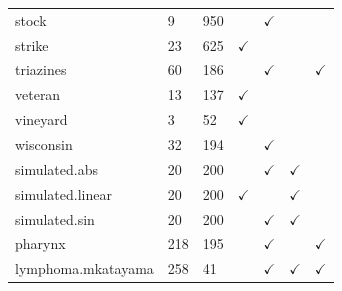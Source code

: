 \documentclass[12pt]{article}
\begin{document}
\begin{table}[!t]
\begin{tabular}{l|l|l|c|c|c|c}
stock                                        & 9                                             & 950                                            &          &$\checkmark$         &        &            \\
strike                                       & 23                                            & 625                                            &$\checkmark$       &            &        &            \\
triazines                                    & 60                                            & 186                                            &          &$\checkmark$         &        &$\checkmark$         \\
veteran                                      & 13                                            & 137                                            &$\checkmark$       &            &        &            \\
vineyard                                     & 3                                             & 52                                             &$\checkmark$       &            &        &            \\
wisconsin                                    & 32                                            & 194                                            &          &$\checkmark$         &        &            \\ \midrule
simulated.abs                                & 20                                            & 200                                            &          &$\checkmark$         &$\checkmark$     &            \\
simulated.linear                             & 20                                            & 200                                            &$\checkmark$       &            &$\checkmark$     &            \\
simulated.sin                                & 20                                            & 200                                            &          &$\checkmark$         &$\checkmark$     &            \\ \midrule
pharynx                                      & 218                                           & 195                                            &          &$\checkmark$         &        &$\checkmark$         \\
lymphoma.mkatayama                               & 258                                           & 41                                             &          &$\checkmark$         &$\checkmark$     &$\checkmark$         \\

\end{tabular}
\end{table}
\end{document}

